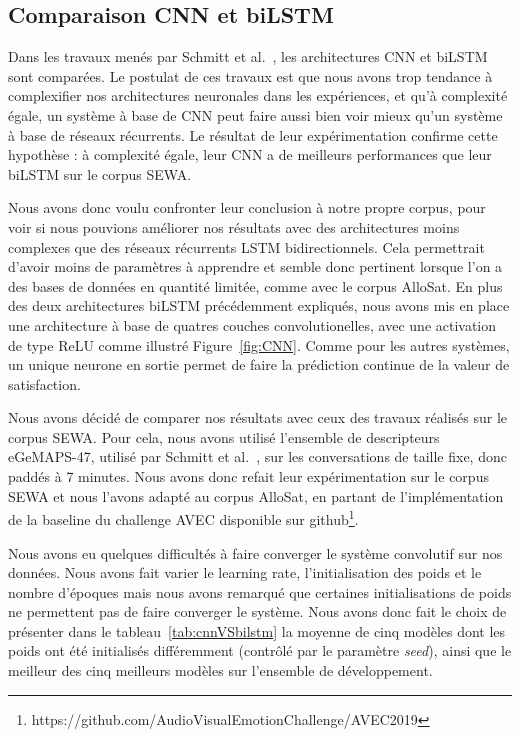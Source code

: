 \subsection{Comparaison CNN et biLSTM}
Dans les travaux menés par Schmitt et al.~\cite{Schmitt2019}, les architectures CNN et biLSTM sont comparées. Le postulat de ces travaux est que nous avons trop tendance à complexifier nos architectures neuronales dans les expériences, et qu'à complexité égale, un système à base de CNN peut faire aussi bien voir mieux qu'un système à base de réseaux récurrents. Le résultat de leur expérimentation confirme cette hypothèse : à complexité égale, leur CNN a de meilleurs performances que leur biLSTM sur le corpus SEWA.

Nous avons donc voulu confronter leur conclusion à notre propre corpus, pour voir si nous pouvions améliorer nos résultats avec des architectures moins complexes que des réseaux récurrents LSTM bidirectionnels. Cela permettrait d'avoir moins de paramètres à apprendre et semble donc pertinent lorsque l'on a des bases de données en quantité limitée, comme avec le corpus AlloSat. En plus des deux architectures biLSTM précédemment expliqués, nous avons mis en place une architecture à base de quatres couches convolutionelles, avec une activation de type ReLU comme illustré Figure~\ref{fig:CNN}. Comme pour les autres systèmes, un unique neurone en sortie permet de faire la prédiction continue de la valeur de satisfaction.



Nous avons décidé de comparer nos résultats avec ceux des travaux réalisés sur le corpus SEWA. Pour cela, nous avons utilisé l'ensemble de descripteurs eGeMAPS-47, utilisé par Schmitt et al.~\cite{Schmitt2019}, sur les conversations de taille fixe, donc paddés à 7 minutes. Nous avons donc refait leur expérimentation sur le corpus SEWA et nous l'avons adapté au corpus AlloSat, en partant de l'implémentation de la baseline du challenge AVEC disponible sur github\footnote{https://github.com/AudioVisualEmotionChallenge/AVEC2019}.

Nous avons eu quelques difficultés à faire converger le système convolutif sur nos données. Nous avons fait varier le learning rate, l'initialisation des poids et le nombre d'époques mais nous avons remarqué que certaines initialisations de poids ne permettent pas de faire converger le système. Nous avons donc fait le choix de présenter dans le tableau~\ref{tab:cnnVSbilstm} la moyenne de cinq modèles dont les poids ont été initialisés différemment (contrôlé par le paramètre \textit{seed}), ainsi que le meilleur des cinq meilleurs modèles sur l'ensemble de développement.

